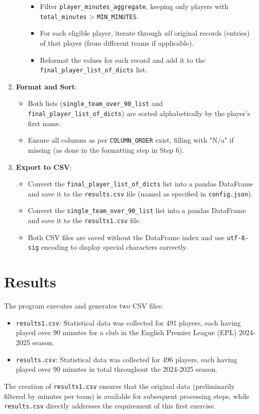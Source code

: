 \documentclass[12pt, a4paper]{report}
\begin{document}
\begin{enumerate}[label=\textbf{Step \arabic*:}, leftmargin=*]
\begin{itemize}[leftmargin=0em]
\begin{itemize}
            \item Filter \texttt{player\_minutes\_aggregate}, keeping only players with \texttt{total\_minutes} > \texttt{MIN\_MINUTES}.
            \item For each eligible player, iterate through \textit{all} original records (entries) of that player (from different teams if applicable).
            \item Reformat the values for each record and add it to the \sloppypar \texttt{final\_player\_list\_of\_dicts} list.
        \end{itemize}
    \end{itemize}
    \item \textbf{Format and Sort}:
    \begin{itemize}[leftmargin=0em]
        \item Both lists (\texttt{single\_team\_over\_90\_list} and \texttt{final\_player\_list\_of\_dicts}) are sorted alphabetically by the player's first name.
        \item Ensure all columns as per \texttt{COLUMN\_ORDER} exist, filling with "N/a" if missing (as done in the formatting step in Step 6).
    \end{itemize}
    \item \textbf{Export to CSV}:
    \begin{itemize}[leftmargin=0em]
        \item Convert the \texttt{final\_player\_list\_of\_dicts} list into a pandas DataFrame and save it to the \texttt{results.csv} file (named as specified in \texttt{config.json}).
        \item Convert the \texttt{single\_team\_over\_90\_list} list into a pandas DataFrame and save it to the \texttt{results1.csv} file.
        \item Both CSV files are saved without the DataFrame index and use \texttt{utf-8-sig} encoding to display special characters correctly.
    \end{itemize}
\end{enumerate}

\section{Results}
The program executes and generates two CSV files:
\begin{itemize}
\renewcommand{\labelitemi}{}
    \item \texttt{results1.csv}: Statistical data was collected for 491 players, each having played over 90 minutes for a club in the English Premier League (EPL) 2024-2025 season.
    \item \texttt{results.csv}: Statistical data was collected for 496 players, each having played over 90 minutes in total throughout the 2024-2025 season.
\end{itemize}
The creation of \texttt{results1.csv} ensures that the original data (preliminarily filtered by minutes per team) is available for subsequent processing steps, while \texttt{results.csv} directly addresses the requirement of this first exercise.
\end{document}
